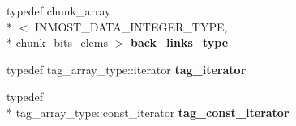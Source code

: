 \begin{DoxyCompactItemize}
\item 
\hypertarget{classINMOST_1_1TagManager_a6516013a33fc678ce51ee7a9566ffc9b}{typedef chunk\-\_\-array\\*
$<$ I\-N\-M\-O\-S\-T\-\_\-\-D\-A\-T\-A\-\_\-\-I\-N\-T\-E\-G\-E\-R\-\_\-\-T\-Y\-P\-E, \\*
chunk\-\_\-bits\-\_\-elems $>$ {\bfseries back\-\_\-links\-\_\-type}}\label{classINMOST_1_1TagManager_a6516013a33fc678ce51ee7a9566ffc9b}

\item 
\hypertarget{classINMOST_1_1TagManager_a083c5b8cf529631c183d8663e69e6527}{typedef tag\-\_\-array\-\_\-type\-::iterator {\bfseries tag\-\_\-iterator}}\label{classINMOST_1_1TagManager_a083c5b8cf529631c183d8663e69e6527}

\item 
\hypertarget{classINMOST_1_1TagManager_a84ab39af175e4d73ca4b9a9a7915401a}{typedef \\*
tag\-\_\-array\-\_\-type\-::const\-\_\-iterator {\bfseries tag\-\_\-const\-\_\-iterator}}\label{classINMOST_1_1TagManager_a84ab39af175e4d73ca4b9a9a7915401a}

\end{DoxyCompactItemize}
